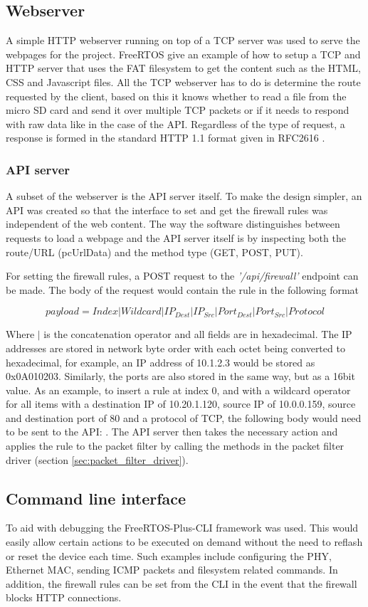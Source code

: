 \subsection{Webserver}
A simple HTTP webserver running on top of a TCP server was used to serve the webpages for the project. FreeRTOS give an example of how to setup a TCP and HTTP server that uses the FAT filesystem to get the content such as the HTML, CSS and Javascript files. All the TCP webserver has to do is determine the route requested by the client, based on this it knows whether to read a file from the micro SD card and send it over multiple TCP packets or if it needs to respond with raw data like in the case of the API. Regardless of the type of request, a response is formed in the standard HTTP 1.1 format given in RFC2616 \cite{rfc2616}.

\newpage
\subsubsection{API server}
A subset of the webserver is the API server itself. To make the design simpler, an API was created so that the interface to set and get the firewall rules was independent of the web content. The way the software distinguishes between requests to load a webpage and the API server itself is by inspecting both the route/URL (pcUrlData) and the method type (GET, POST, PUT).

For setting the firewall rules, a POST request to the \textit{'/api/firewall'} endpoint can be made. The body of the request would contain the rule in the following format

\[
payload=Index | Wildcard | IP_{Dest} |  IP_{Src}  | Port_{Dest} |  Port_{Src} | Protocol
\]

Where $|$ is the concatenation operator and all fields are in hexadecimal. The IP addresses are stored in network byte order with each octet being converted to hexadecimal, for example, an IP address of 10.1.2.3 would be stored as 0x0A010203. Similarly, the ports are also stored in the same way, but as a 16bit value. As an example, to insert a rule at index 0, and with a wildcard operator for all items with a destination IP of 10.20.1.120, source IP of 10.0.0.159, source and destination port of 80 and a protocol of TCP, the following body would need to be sent to the API: . The API server then takes the necessary action and applies the rule to the packet filter by calling the methods in the packet filter driver (section \ref{sec:packet_filter_driver}).



\subsection{Command line interface}

To aid with debugging the FreeRTOS-Plus-CLI framework was used. This would easily allow certain actions to be executed on demand without the need to reflash or reset the device each time. Such examples include configuring the PHY, Ethernet MAC, sending ICMP packets and filesystem related commands. In addition, the firewall rules can be set from the CLI in the event that the firewall blocks HTTP connections. 
